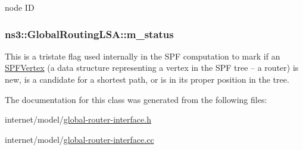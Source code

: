 node ID 

\subsubsection[{\texorpdfstring{m\+\_\+status}{m_status}}]{ ns3\+::\+Global\+Routing\+L\+S\+A\+::m\+\_\+status\hspace{0.3cm}{\ttfamily [private]}}\hypertarget{classns3_1_1GlobalRoutingLSA_a9b3e65ddc724b95ddd7f4aae75d7518b}{}\label{classns3_1_1GlobalRoutingLSA_a9b3e65ddc724b95ddd7f4aae75d7518b}
This is a tristate flag used internally in the S\+PF computation to mark if an \hyperlink{classns3_1_1SPFVertex}{S\+P\+F\+Vertex} (a data structure representing a vertex in the S\+PF tree -- a router) is new, is a candidate for a shortest path, or is in its proper position in the tree. 

The documentation for this class was generated from the following files\+:\begin{DoxyCompactItemize}
\item 
internet/model/\hyperlink{global-router-interface_8h}{global-\/router-\/interface.\+h}\item 
internet/model/\hyperlink{global-router-interface_8cc}{global-\/router-\/interface.\+cc}\end{DoxyCompactItemize}
